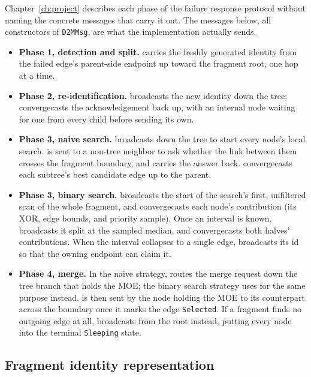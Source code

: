 Chapter~\ref{ch:project} describes each phase of the failure response protocol without
naming the concrete messages that carry it out. The messages below, all constructors of
\texttt{D2MMsg}, are what the implementation actually sends.

\begin{itemize}
  \item \textbf{Phase 1, detection and split.}  carries the freshly
  generated identity from the failed edge's parent-side endpoint up toward the fragment
  root, one hop at a time.
  \item \textbf{Phase 2, re-identification.}  broadcasts the new identity down
  the tree;  convergecasts the acknowledgement back up, with an internal
  node waiting for one from every child before sending its own.
  \item \textbf{Phase 3, naive search.}  broadcasts down the tree to start
  every node's local search.  is sent to a non-tree neighbor to ask whether
  the link between them crosses the fragment boundary, and  carries the
  answer back.  convergecasts each subtree's best candidate edge up to the
  parent.
  \item \textbf{Phase 3, binary search.}  broadcasts the start of the
  search's first, unfiltered scan of the whole fragment, and 
  convergecasts each node's contribution (its XOR, edge bounds, and priority sample). Once
  an interval is known,  broadcasts it split at the sampled median, and
   convergecasts both halves' contributions. When the interval
  collapses to a single edge,  broadcasts its id so that the owning
  endpoint can claim it.
  \item \textbf{Phase 4, merge.} In the naive strategy,  routes the
  merge request down the tree branch that holds the MOE; the binary search strategy uses
   for the same purpose instead.  is then sent by the node
  holding the MOE to its counterpart across the boundary once it marks the edge
  \texttt{Selected}. If a fragment finds no outgoing edge at all, 
  broadcasts from the root instead, putting every node into the terminal
  \texttt{Sleeping} state.
\end{itemize}

\subsection{Fragment identity representation}\label{sec:fragment-id}

